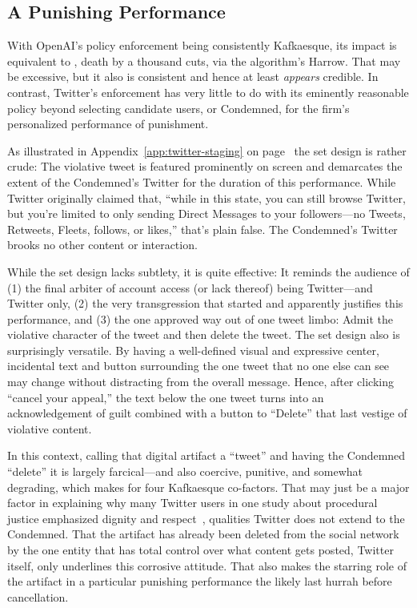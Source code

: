 \subsection{A Punishing Performance}

With OpenAI's policy enforcement being consistently Kafkaesque, its impact is
equivalent to \lingchi, death by a thousand cuts, via the algorithm's Harrow.
That may be excessive, but it also is consistent and hence at least
\emph{appears} credible. In contrast, Twitter's enforcement has very little to
do with its eminently reasonable policy beyond selecting candidate users, or
Condemned, for the firm's personalized performance of punishment.

As illustrated in Appendix~\ref{app:twitter-staging} on
page~\pageref{app:twitter-staging} the set design is rather crude: The
violative tweet is featured prominently on screen and demarcates the extent of
the Condemned's Twitter for the duration of this performance. While Twitter
originally claimed that, ``while in this state, you can still browse Twitter,
but you're limited to only sending Direct Messages to your followers---no
Tweets, Retweets, Fleets, follows, or likes,'' that's plain false. The
Condemned's Twitter brooks no other content or interaction.

While the set design lacks subtlety, it is quite effective: It reminds the
audience of (1) the final arbiter of account access (or lack thereof) being
Twitter---and Twitter only, (2) the very transgression that started and
apparently justifies this performance, and (3) the one approved way out of one
tweet limbo: Admit the violative character of the tweet and then delete the
tweet. The set design also is surprisingly versatile. By having a well-defined
visual and expressive center, incidental text and button surrounding the one
tweet that no one else can see may change without distracting from the overall
message. Hence, after clicking ``cancel your appeal,'' the text below the one
tweet turns into an acknowledgement of guilt combined with a button to
``Delete'' that last vestige of violative content.

In this context, calling that digital artifact a ``tweet'' and having the
Condemned ``delete'' it is largely farcical---and also coercive, punitive, and
somewhat degrading, which makes for four Kafkaesque co-factors. That may just be
a major factor in explaining why many Twitter users in one study about
procedural justice emphasized dignity and respect~\cite{KatsarosTylerea2022},
qualities Twitter does not extend to the Condemned. That the artifact has
already been deleted from the social network by the one entity that has total
control over what content gets posted, Twitter itself, only underlines this
corrosive attitude. That also makes the starring role of the artifact in a
particular punishing performance the likely last hurrah before cancellation.

